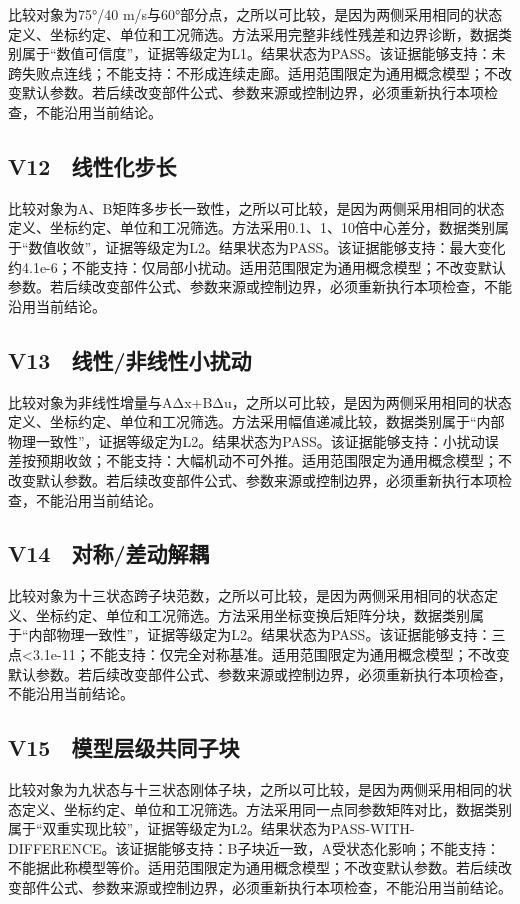 \documentclass[UTF8,12pt,openany]{ctexbook}
\begin{document}
比较对象为75°/40 m/s与60°部分点，之所以可比较，是因为两侧采用相同的状态定义、坐标约定、单位和工况筛选。方法采用完整非线性残差和边界诊断，数据类别属于“数值可信度”，证据等级定为L1。结果状态为PASS。该证据能够支持：未跨失败点连线；不能支持：不形成连续走廊。适用范围限定为通用概念模型；不改变默认参数。若后续改变部件公式、参数来源或控制边界，必须重新执行本项检查，不能沿用当前结论。

\subsection{V12　线性化步长}

比较对象为A、B矩阵多步长一致性，之所以可比较，是因为两侧采用相同的状态定义、坐标约定、单位和工况筛选。方法采用0.1、1、10倍中心差分，数据类别属于“数值收敛”，证据等级定为L2。结果状态为PASS。该证据能够支持：最大变化约4.1e-6；不能支持：仅局部小扰动。适用范围限定为通用概念模型；不改变默认参数。若后续改变部件公式、参数来源或控制边界，必须重新执行本项检查，不能沿用当前结论。

\subsection{V13　线性/非线性小扰动}

比较对象为非线性增量与AΔx+BΔu，之所以可比较，是因为两侧采用相同的状态定义、坐标约定、单位和工况筛选。方法采用幅值递减比较，数据类别属于“内部物理一致性”，证据等级定为L2。结果状态为PASS。该证据能够支持：小扰动误差按预期收敛；不能支持：大幅机动不可外推。适用范围限定为通用概念模型；不改变默认参数。若后续改变部件公式、参数来源或控制边界，必须重新执行本项检查，不能沿用当前结论。

\subsection{V14　对称/差动解耦}

比较对象为十三状态跨子块范数，之所以可比较，是因为两侧采用相同的状态定义、坐标约定、单位和工况筛选。方法采用坐标变换后矩阵分块，数据类别属于“内部物理一致性”，证据等级定为L2。结果状态为PASS。该证据能够支持：三点<3.1e-11；不能支持：仅完全对称基准。适用范围限定为通用概念模型；不改变默认参数。若后续改变部件公式、参数来源或控制边界，必须重新执行本项检查，不能沿用当前结论。

\subsection{V15　模型层级共同子块}

比较对象为九状态与十三状态刚体子块，之所以可比较，是因为两侧采用相同的状态定义、坐标约定、单位和工况筛选。方法采用同一点同参数矩阵对比，数据类别属于“双重实现比较”，证据等级定为L2。结果状态为PASS-WITH-DIFFERENCE。该证据能够支持：B子块近一致，A受状态化影响；不能支持：不能据此称模型等价。适用范围限定为通用概念模型；不改变默认参数。若后续改变部件公式、参数来源或控制边界，必须重新执行本项检查，不能沿用当前结论。
\end{document}
